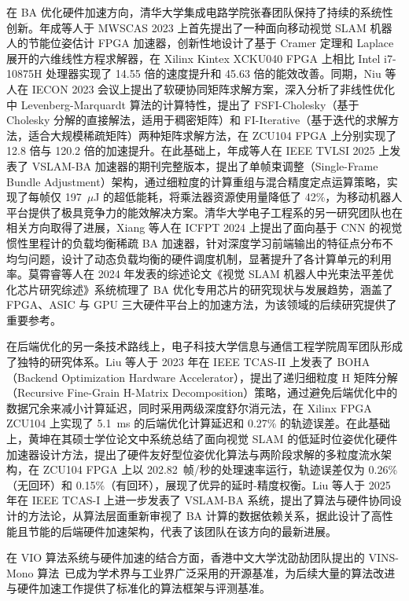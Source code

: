 在 BA 优化硬件加速方向，清华大学集成电路学院张春团队保持了持续的系统性创新。年成等人\cite{nian2023energy}于 MWSCAS 2023 上首先提出了一种面向移动视觉 SLAM 机器人的节能位姿估计 FPGA 加速器，创新性地设计了基于 Cramer 定理和 Laplace 展开的六维线性方程求解器，在 Xilinx Kintex XCKU040 FPGA 上相比 Intel i7-10875H 处理器实现了 14.55 倍的速度提升和 45.63 倍的能效改善。同期，Niu 等人\cite{niu2023hwsw}在 IECON 2023 会议上提出了软硬协同矩阵求解方案，深入分析了非线性优化中 Levenberg-Marquardt 算法的计算特性，提出了 FSFI-Cholesky（基于 Cholesky 分解的直接解法，适用于稠密矩阵）和 FI-Iterative（基于迭代的求解方法，适合大规模稀疏矩阵）两种矩阵求解方法，在 ZCU104 FPGA 上分别实现了 12.8 倍与 120.2 倍的加速提升。在此基础上，年成等人\cite{nian2025vslamba}在 IEEE TVLSI 2025 上发表了 VSLAM-BA 加速器的期刊完整版本，提出了单帧束调整（Single-Frame Bundle Adjustment）架构，通过细粒度的计算重组与混合精度定点运算策略，实现了每帧仅 197~$\mu$J 的超低能耗，将乘法器资源使用量降低了 42\%，为移动机器人平台提供了极具竞争力的能效解决方案。清华大学电子工程系的另一研究团队也在相关方向取得了进展，Xiang 等人\cite{xiang2024loadbalanced}在 ICFPT 2024 上提出了面向基于 CNN 的视觉惯性里程计的负载均衡稀疏 BA 加速器，针对深度学习前端输出的特征点分布不均匀问题，设计了动态负载均衡的硬件调度机制，显著提升了各计算单元的利用率。莫霄睿等人\cite{mo2024ba_review}在 2024 年发表的综述论文《视觉 SLAM 机器人中光束法平差优化芯片研究综述》系统梳理了 BA 优化专用芯片的研究现状与发展趋势，涵盖了 FPGA、ASIC 与 GPU 三大硬件平台上的加速方法，为该领域的后续研究提供了重要参考。

在后端优化的另一条技术路线上，电子科技大学信息与通信工程学院周军团队形成了独特的研究体系。Liu 等人\cite{liu2023boha}于 2023 年在 IEEE TCAS-II 上发表了 BOHA（Backend Optimization Hardware Accelerator），提出了递归细粒度 H 矩阵分解（Recursive Fine-Grain H-Matrix Decomposition）策略，通过避免后端优化中的数据冗余来减小计算延迟，同时采用两级深度舒尔消元法，在 Xilinx FPGA ZCU104 上实现了 5.1~ms 的后端优化计算延迟和 0.27\% 的轨迹误差。在此基础上，黄坤\cite{huangkun2025vslam}在其硕士学位论文中系统总结了面向视觉 SLAM 的低延时位姿优化硬件加速器设计方法，提出了硬件友好型位姿优化算法与两阶段求解的多粒度流水架构，在 ZCU104 FPGA 上以 202.82~帧/秒的处理速率运行，轨迹误差仅为 0.26\%（无回环）和 0.15\%（有回环），展现了优异的延时-精度权衡。Liu 等人\cite{liu2025vslamba}于 2025 年在 IEEE TCAS-I 上进一步发表了 VSLAM-BA 系统，提出了算法与硬件协同设计的方法论，从算法层面重新审视了 BA 计算的数据依赖关系，据此设计了高性能且节能的后端硬件加速架构，代表了该团队在该方向的最新进展。

在 VIO 算法系统与硬件加速的结合方面，香港中文大学沈劭劼团队提出的 VINS-Mono 算法~\cite{qin2018vins}已成为学术界与工业界广泛采用的开源基准，为后续大量的算法改进与硬件加速工作提供了标准化的算法框架与评测基准。

